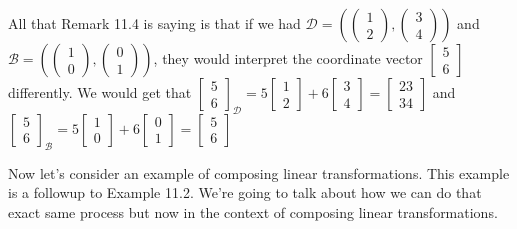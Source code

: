 \begin{example}
        All that Remark 11.4 is saying is that if we had $\mathcal{D}=(\begin{pmatrix}
        1 \\ 2
    \end{pmatrix}, \begin{pmatrix}
        3 \\ 4
    \end{pmatrix})$ and $\mathcal{B}=(\begin{pmatrix}
        1 \\ 0
    \end{pmatrix}, \begin{pmatrix}
        0 \\ 1
    \end{pmatrix})$, they would interpret the coordinate vector $\begin{bmatrix}
        5 \\ 6
    \end{bmatrix}$ differently. We would get that $\begin{bmatrix}
        5 \\ 6
    \end{bmatrix}_\mathcal{D}=5\begin{bmatrix}
        1 \\ 2
    \end{bmatrix}+6\begin{bmatrix}
        3 \\ 4
    \end{bmatrix}=\begin{bmatrix}
        23 \\ 34
    \end{bmatrix}$ and $\begin{bmatrix}
        5 \\ 6
    \end{bmatrix}_\mathcal{B}=5\begin{bmatrix}
        1 \\ 0
    \end{bmatrix}+6\begin{bmatrix}
        0 \\ 1
    \end{bmatrix}=\begin{bmatrix}
        5 \\ 6
    \end{bmatrix}$
\end{example}
Now let's consider an example of composing linear transformations. This example is a followup to Example 11.2. We're going to talk about how we can do that exact same process but now in the context of composing linear transformations.
